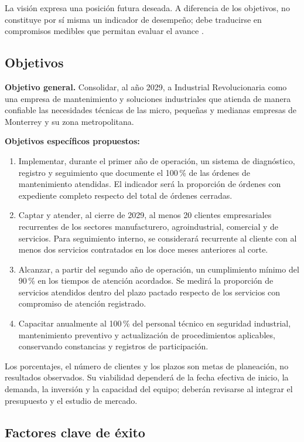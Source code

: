 {La visión expresa una posición futura deseada. A diferencia de los objetivos, no constituye por sí misma un indicador de desempeño; debe traducirse en compromisos medibles que permitan evaluar el avance \citep{planNegociosGlosario2024}.

\subsection{Objetivos}

\textbf{Objetivo general.} Consolidar, al año 2029, a Industrial Revolucionaria como una empresa de mantenimiento y soluciones industriales que atienda de manera confiable las necesidades técnicas de las micro, pequeñas y medianas empresas de Monterrey y su zona metropolitana.

\textbf{Objetivos específicos propuestos:}
\begin{enumerate}
\item Implementar, durante el primer año de operación, un sistema de diagnóstico, registro y seguimiento que documente el 100\,\% de las órdenes de mantenimiento atendidas. El indicador será la proporción de órdenes con expediente completo respecto del total de órdenes cerradas.
\item Captar y atender, al cierre de 2029, al menos 20 clientes empresariales recurrentes de los sectores manufacturero, agroindustrial, comercial y de servicios. Para seguimiento interno, se considerará recurrente al cliente con al menos dos servicios contratados en los doce meses anteriores al corte.
\item Alcanzar, a partir del segundo año de operación, un cumplimiento mínimo del 90\,\% en los tiempos de atención acordados. Se medirá la proporción de servicios atendidos dentro del plazo pactado respecto de los servicios con compromiso de atención registrado.
\item Capacitar anualmente al 100\,\% del personal técnico en seguridad industrial, mantenimiento preventivo y actualización de procedimientos aplicables, conservando constancias y registros de participación.
\end{enumerate}

Los porcentajes, el número de clientes y los plazos son metas de planeación, no resultados observados. Su viabilidad dependerá de la fecha efectiva de inicio, la demanda, la inversión y la capacidad del equipo; deberán revisarse al integrar el presupuesto y el estudio de mercado.

\subsection{Factores clave de éxito}

}
